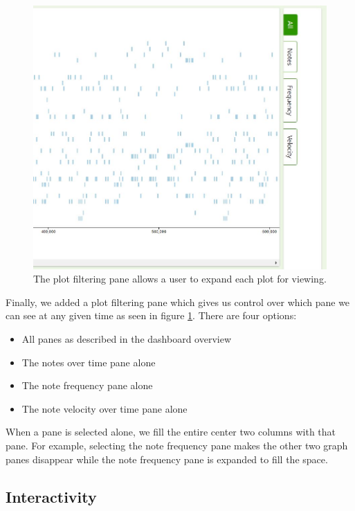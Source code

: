 \documentclass[journal]{vgtc}                %
\begin{document}
\begin{figure}[h]
  \centering
  \includegraphics[width=\columnwidth]{plot-filtering-single-track}
  \caption{The plot filtering pane allows a user to expand each plot for viewing.}
  \label{fig:plot-filtering}
\end{figure}

Finally, we added a plot filtering pane which gives us control over which pane
we can see at any given time as seen in figure \ref{fig:plot-filtering}. There
are four options:

\begin{itemize}
  \item All panes as described in the dashboard overview
  \item The notes over time pane alone
  \item The note frequency pane alone
  \item The note velocity over time pane alone
\end{itemize}

When a pane is selected alone, we fill the entire center two columns with that
pane. For example, selecting the note frequency pane makes the other two graph
panes disappear while the note frequency pane is expanded to fill the space.

\subsection{Interactivity}
\end{document}
